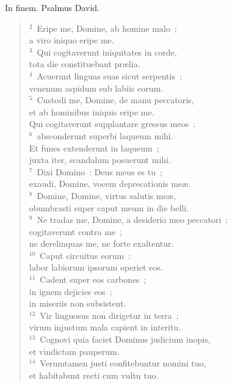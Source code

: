 \bchapter
\lettrine[lines=3,image=true,loversize=0.05,lraise=-0.03]{I}{}n finem. Psalmus David.
\begin{flushleft}\begin{verse}\vspace{6pt}${}^{2}$~Eripe me, Domine, ab homine malo~;\\ a viro iniquo eripe me.\\
${}^{3}$~Qui cogitaverunt iniquitates in corde,\\ tota die constituebant pr\ae lia.\\
${}^{4}$~Acuerunt linguas suas sicut serpentis~;\\ venenum aspidum sub labiis eorum.\\
${}^{5}$~Custodi me, Domine, de manu peccatoris,\\ et ab hominibus iniquis eripe me.\\ Qui cogitaverunt supplantare gressus meos~:\\
${}^{6}$~absconderunt superbi laqueum mihi.\\ Et funes extenderunt in laqueum~;\\ juxta iter, scandalum posuerunt mihi.\\
${}^{7}$~Dixi Domino~: Deus meus es tu~;\\ exaudi, Domine, vocem deprecationis me\ae .\\
${}^{8}$~Domine, Domine, virtus salutis me\ae ,\\ obumbrasti super caput meum in die belli.\\
${}^{9}$~Ne tradas me, Domine, a desiderio meo peccatori~:\\ cogitaverunt contra me~;\\ ne derelinquas me, ne forte exaltentur.\\
${}^{10}$~Caput circuitus eorum~:\\ labor labiorum ipsorum operiet eos.\\
${}^{11}$~Cadent super eos carbones~;\\ in ignem dejicies eos~:\\ in miseriis non subsistent.\\
${}^{12}$~Vir linguosus non dirigetur in terra~;\\ virum injustum mala capient in interitu.\\
${}^{13}$~Cognovi quia faciet Dominus judicium inopis,\\ et vindictam pauperum.\\
${}^{14}$~Verumtamen justi confitebuntur nomini tuo,\\ et habitabunt recti cum vultu tuo.\end{verse}\end{flushleft}




